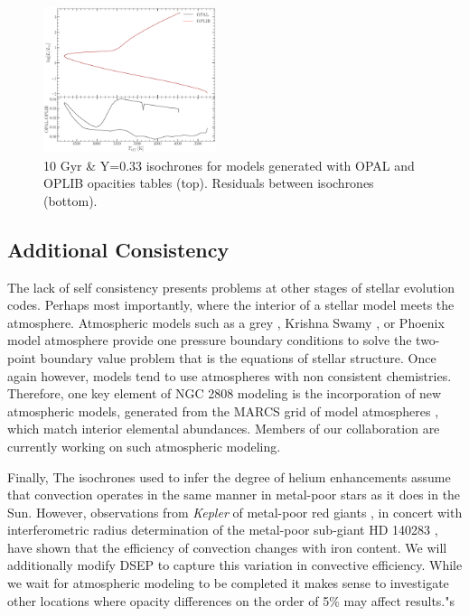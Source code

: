 \begin{figure}
	\centering
	\includegraphics[width=0.45\textwidth]{src/Figures/033ZIsosOPALOPLIB.pdf}
	\caption{10 Gyr \& Y=0.33 isochrones for models generated with OPAL and
	OPLIB opacities tables (top). Residuals between isochrones (bottom).}
	\label{fig:NGC2808ISO}
\end{figure}

\subsection{Additional Consistency}
The lack of self consistency presents problems at other stages of stellar
evolution codes. Perhaps most importantly, where the interior of a stellar
model meets the atmosphere. Atmospheric models such as a grey
\citep{Eddington1916}, Krishna Swamy \citep{Krishna1966}, or Phoenix
\citep{Husser2013} model atmosphere provide one pressure boundary conditions to
solve the two-point boundary value problem that is the equations of stellar
structure. Once again however, models tend to use atmospheres with non
consistent chemistries. Therefore, one key element of NGC 2808 modeling is the
incorporation of new atmospheric models, generated from the MARCS grid of model
atmospheres \citep{Plez2008}, which match interior elemental abundances.
Members of our collaboration are currently working on such atmospheric
modeling.

Finally, The isochrones used to infer the degree of helium enhancements assume
that convection operates in the same manner in metal-poor stars as it does in
the Sun. However, observations from \textit{Kepler} of metal-poor red giants
\citep{Bonaca2012, tayar2017correlation}, in concert with interferometric
radius determination of the metal-poor sub-giant HD 140283
\citep{creevey2015benchmark}, have shown that the efficiency of convection
changes with iron content. We will additionally modify DSEP to capture this
variation in convective efficiency. While we wait for atmospheric modeling to
be completed it makes sense to investigate other locations where opacity
differences on the order of 5\% may affect results."s
